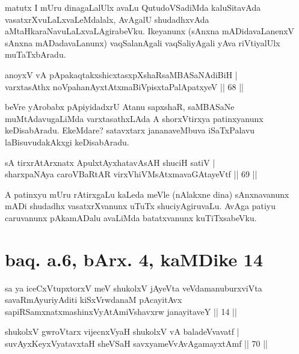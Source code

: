 \begin{artha}
matutx I mUru dinagaLalUlx avaLu QutudoVSadiMda kaluSitavAda vasatxrXvuLaLxvaLeMdalalx, AvAgalU shudadhxvAda aMtaHkaraNavuLaLxvaLAgirabeVku. Ikeyanunx (sAnxna mADidavaLanenxV sAnxna mADadavaLanunx) vaqSalanAgali vaqSaliyAgali yAva riVtiyalUlx muTaTxbAradu.
\end{artha}

\begin{shl}
anoyxV vA pApakaqtakxshicxtasxpXshaRsaMBASaNAdiBiH | \\
varxtasAthx noVpahanAyxtAtxmaBiVpisxtaPalApatxyeV \hfill|| 68 || 
\end{shl}

\begin{artha}
beVre yArobabx pApiyidadxrU Atanu sapxshaR, saMBASaNe muMtAdavugaLiMda varxtasathxLAda A shorxVtirxya patinxyanunx keDisabAradu. EkeMdare? satavxtarx jananaveMbuva iSaTxPalavu laBisuvudakAkxgi keDisabAradu.
\end{artha}


\begin{shl}
sA tirxrAtArxnatx ApulxtAyxhatavAsAH shuciH satiV | \\
sharxpaNAya caroVBaRtAR virxVhiVMsAtxmavaGAtayeVtf \hfill|| 69 || 
\end{shl}

\begin{artha}
A patinxyu mUru rAtirxgaLu kaLeda meVle (nAlakxne dina) sAnxnavanunx mADi shudadhx vasatxrXvanunx uTuTx shuciyAgiruvaLu. AvAga patiyu caruvanunx pAkamADalu avaLiMda batatxvanunx kuTiTxsabeVku.
\end{artha}

\section*{baq. a.6, bArx. 4, kaMDike 14}

\begin{shl}
sa ya iceCxVtupxtorxV meV shukolxV jAyeVta veVdamanuburxviVta savaRmAyuriyAditi kiSxVrwdanaM pAcayitAvx sapiRSamxnatxmashinxVyAtAmiVshavxrw janayitaveY || 14 ||
\end{shl}

\begin{shl}
shukolxV gwroV\s tarx vijecnxVyaH shukolxV vA baladeVvavatf | \\
suvAyxKeyxVyatavxtaH sheVSaH savxyameVvAvAgamayxtAmf \hfill|| 70 || 
\end{shl}


